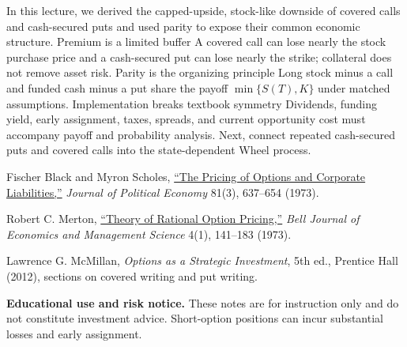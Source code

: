 \documentclass[11pt]{article}
\begin{document}
\Needspace{0.38\textheight}
\keytakeaways
  {In this lecture, we derived the capped-upside, stock-like downside of covered calls and cash-secured puts and used parity to expose their common economic structure.}
  {Premium is a limited buffer}
  {A covered call can lose nearly the stock purchase price and a cash-secured put can lose nearly the strike; collateral does not remove asset risk.}
  {Parity is the organizing principle}
  {Long stock minus a call and funded cash minus a put share the payoff $\min\{S(T),K\}$ under matched assumptions.}
  {Implementation breaks textbook symmetry}
  {Dividends, funding yield, early assignment, taxes, spreads, and current opportunity cost must accompany payoff and probability analysis.}
  {Next, connect repeated cash-secured puts and covered calls into the state-dependent Wheel process.}

\begin{readinglist}
  \item Fischer Black and Myron Scholes, \href{https://doi.org/10.1086/260062}{``The Pricing of Options and Corporate Liabilities,''} \emph{Journal of Political Economy} 81(3), 637--654 (1973).
  \item Robert C. Merton, \href{https://doi.org/10.2307/1831029}{``Theory of Rational Option Pricing,''} \emph{Bell Journal of Economics and Management Science} 4(1), 141--183 (1973).
  \item Lawrence G. McMillan, \emph{Options as a Strategic Investment}, 5th ed., Prentice Hall (2012), sections on covered writing and put writing.
\end{readinglist}

\vfill
{\sffamily\footnotesize\color{vnmuted}\textbf{Educational use and risk notice.} These notes are for instruction only and do not constitute investment advice. Short-option positions can incur substantial losses and early assignment.}
\end{document}
